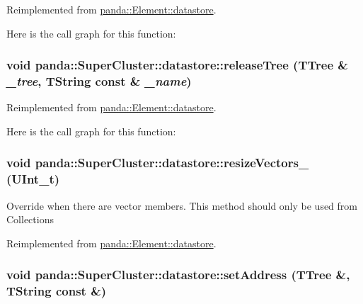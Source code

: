 Reimplemented from \hyperlink{structpanda_1_1Element_1_1datastore_a9f9eb1f7611bc73f10a010a149d17a15}{panda::Element::datastore}.

Here is the call graph for this function:\hypertarget{structpanda_1_1SuperCluster_1_1datastore_afc373864f03ba4e73ef1237f88bcfd4e}{
\subsubsection[{releaseTree}]{\setlength{\rightskip}{0pt plus 5cm}void panda::SuperCluster::datastore::releaseTree (TTree \& {\em \_\-tree}, \/  TString const \& {\em \_\-name})}}
\label{structpanda_1_1SuperCluster_1_1datastore_afc373864f03ba4e73ef1237f88bcfd4e}


Reimplemented from \hyperlink{structpanda_1_1Element_1_1datastore_a7acb1440122c336e94738695ca5a11bd}{panda::Element::datastore}.

Here is the call graph for this function:\hypertarget{structpanda_1_1SuperCluster_1_1datastore_a8ca840d594bb0fd1168615b0ae11988f}{
\subsubsection[{resizeVectors\_\-}]{\setlength{\rightskip}{0pt plus 5cm}void panda::SuperCluster::datastore::resizeVectors\_\- (UInt\_\-t)}}
\label{structpanda_1_1SuperCluster_1_1datastore_a8ca840d594bb0fd1168615b0ae11988f}


Override when there are vector members. This method should only be used from Collections 

Reimplemented from \hyperlink{structpanda_1_1Element_1_1datastore_a4696a188a70355c43a5482f895433230}{panda::Element::datastore}.\hypertarget{structpanda_1_1SuperCluster_1_1datastore_a01db9d8a69e180a102f3e7c56f95ff40}{
\subsubsection[{setAddress}]{\setlength{\rightskip}{0pt plus 5cm}void panda::SuperCluster::datastore::setAddress (TTree \&, \/  TString const \&)}}
\label{structpanda_1_1SuperCluster_1_1datastore_a01db9d8a69e180a102f3e7c56f95ff40}



